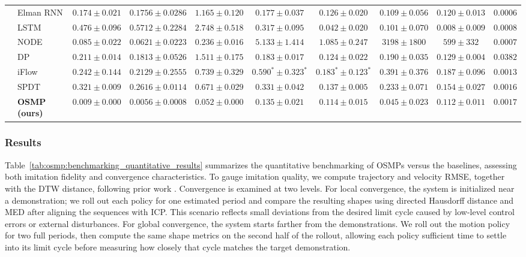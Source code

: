 \begin{table}[htbp]
\begin{tiny}
\begin{tabular}{|l|l|ccc|cc|cc|c|}
    & Elman \gls{RNN} & $0.174 \pm 0.021$ & $0.1756 \pm 0.0286$ & $1.165 \pm 0.120$ & $0.177 \pm 0.037$ & $0.126 \pm 0.020$ & $0.109 \pm 0.056$ & $0.120 \pm 0.013$ & $\mathbf{0.0006}$\\
    & \gls{LSTM} & $0.476 \pm 0.096$ & $0.5712 \pm 0.2284$ & $2.748 \pm 0.518$ & $0.317 \pm 0.095$ & $0.042 \pm 0.020$ & $0.101 \pm 0.070$ & $0.008 \pm 0.009$ & $0.0008$\\
    & \gls{NODE} & $0.085 \pm 0.022$ & $0.0621 \pm 0.0223$ & $0.236 \pm 0.016$ & $5.133 \pm 1.414$ & $1.085 \pm 0.247$ & $3198 \pm 1800$ & $599 \pm 332$ & $0.0007$\\
    & \gls{DP} & $0.211 \pm 0.014$ & $0.1813 \pm 0.0526$ & $1.511 \pm 0.175$ & $0.183 \pm 0.017$ & $0.124 \pm 0.022$ & $0.190 \pm 0.035$ & $0.129 \pm 0.004$ & $0.0382$\\
    & iFlow & $0.242 \pm 0.144$ & $0.2129 \pm 0.2555$ & $0.739 \pm 0.329$ & $0.590^* \pm 0.323^*$ & $0.183^* \pm 0.123^*$ & $0.391 \pm 0.376$ & $0.187 \pm 0.096$ & $0.0013$\\
    & \gls{SPDT} & $0.321 \pm 0.009$ & $0.2616 \pm 0.0114$ & $0.671 \pm 0.029$ & $0.331 \pm 0.042$ & $0.137 \pm 0.005$ & $0.233 \pm 0.071$ & $0.154 \pm 0.027$ & $0.0016$\\
    & \textbf{OSMP (ours)} & $\mathbf{0.009 \pm 0.000}$ & $\mathbf{0.0056 \pm 0.0008}$ & $\mathbf{0.052 \pm 0.000}$ & $0.135 \pm 0.021$ & $0.114 \pm 0.015$ & $0.045 \pm 0.023$ & $0.112 \pm 0.011$ & $0.0017$\\
    \bottomrule
    \end{tabular}
    \end{tiny}
\end{table}

\subsubsection{Results}
Table~\ref{tab:osmp:benchmarking_quantitative_results} summarizes the quantitative benchmarking of \glspl{OSMP} versus the baselines, assessing both imitation fidelity and convergence characteristics. To gauge imitation quality, we compute trajectory and velocity \gls{RMSE}, together with the \gls{DTW} distance, following prior work \citep{urain2020imitationflow, perez2023stable, nawaz2024learning}.
Convergence is examined at two levels. For local convergence, the system is initialized near a demonstration; we roll out each policy for one estimated period and compare the resulting shapes using directed Hausdorff distance and \gls{MED} after aligning the sequences with \gls{ICP}. This scenario reflects small deviations from the desired limit cycle caused by low-level control errors or external disturbances. For global convergence, the system starts farther from the demonstrations. We roll out the motion policy for two full periods, then compute the same shape metrics on the second half of the rollout, allowing each policy sufficient time to settle into its limit cycle before measuring how closely that cycle matches the target demonstration.

